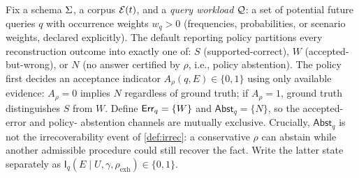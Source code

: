 \begin{definition}
\label{def:debt}
Fix a schema $\Sigma$, a corpus $\mathcal{E}(t)$, and a \emph{query workload} $\mathcal{Q}$: a set
of potential future queries $q$ with occurrence weights $w_q > 0$ (frequencies,
probabilities, or scenario weights, declared explicitly). The default reporting
policy partitions every reconstruction outcome into exactly one of: $S$
(supported-correct), $W$ (accepted-but-wrong), or $N$ (no answer certified by
$\rho$, i.e., policy abstention).
The policy first decides an acceptance indicator $A_\rho(q,E)\in\{0,1\}$ using
only available evidence: $A_\rho=0$ implies $N$ regardless of ground truth; if
$A_\rho=1$, ground truth distinguishes $S$ from $W$. Define
$\mathsf{Err}_q=\{W\}$ and $\mathsf{Abst}_q=\{N\}$, so the accepted-error and policy-
abstention channels are mutually exclusive. Crucially, $\mathsf{Abst}_q$ is not
the irrecoverability event of \cref{def:irrec}: a conservative $\rho$ can abstain
while another admissible procedure could still recover the fact. Write the latter
state separately as $\mathsf I_q(E\mid U,\gamma,\rho_{\mathrm{exh}})\in\{0,1\}$.


\end{definition}
